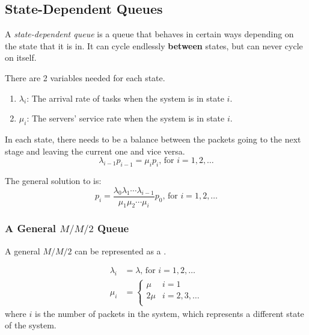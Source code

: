 \subsection{State-Dependent Queues}\label{subsec:State_Dependent_Queues}
\begin{definition}\label{def:State_Dependent_Queue}
  A \emph{state-dependent queue} is a queue that behaves in certain ways depending on the state that it is in.
  It can cycle endlessly \textbf{between} states, but can never cycle on itself.

  There are 2 variables needed for each state.
  \begin{enumerate}[noitemsep]
  \item $\lambda_{i}$: The arrival rate of tasks when the system is in state $i$.
  \item $\mu_{i}$: The servers' service rate when the system is in state $i$.
  \end{enumerate}

  In each state, there needs to be a balance between the packets going to the next stage and leaving the current one and vice versa.
  \begin{equation}\label{eq:State_Dependent_Queue_Balance_Equation}
    \lambda_{i-1} p_{i-1} = \mu_{i} p_{i} \text{, for } i = 1, 2, \ldots
  \end{equation}

  The general solution to  is:
  \begin{equation}\label{eq:eq:State_Dependent_Queue_Balance_Equation-Solution}
    p_{i} = \frac{\lambda_{0} \lambda_{1} \cdots \lambda_{i-1}}{\mu_{1} \mu_{2} \cdots \mu_{i}} p_{0} \text{, for } i = 1, 2, \ldots
  \end{equation}
\end{definition}

\subsubsection{\texorpdfstring{A General $M/M/2$ Queue}{Parallel Servers}}\label{subsubsec:General_MM2_Queue}
A general $M/M/2$  can be represented as a .

\begin{align*}
  \lambda_{i} &= \lambda \text{, for } i = 1, 2, \ldots \\
  \mu_{i} &= \begin{cases}
    \mu & i = 1 \\
    2 \mu & i = 2, 3, \ldots \\
  \end{cases}
\end{align*}
where $i$ is the number of packets in the system, which represents a different state of the system.

